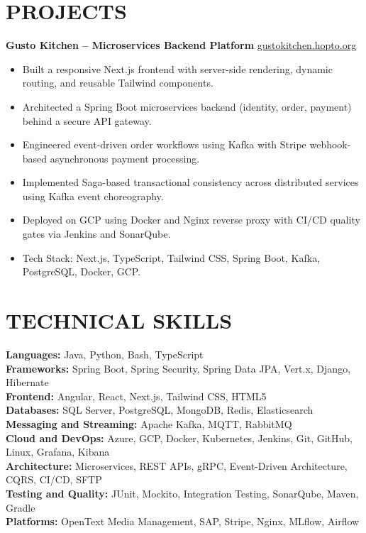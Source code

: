 \documentclass[10pt]{article}
\begin{document}
\section*{PROJECTS}
\textbf{Gusto Kitchen -- Microservices Backend Platform} \hfill \underline{\href{https://gustokitchen.hopto.org/}{gustokitchen.hopto.org}}
\begin{itemize}
  \item Built a responsive Next.js frontend with server-side rendering, dynamic routing, and reusable Tailwind components.
  \item Architected a Spring Boot microservices backend (identity, order, payment) behind a secure API gateway.
  \item Engineered event-driven order workflows using Kafka with Stripe webhook-based asynchronous payment processing.
  \item Implemented Saga-based transactional consistency across distributed services using Kafka event choreography.
  \item Deployed on GCP using Docker and Nginx reverse proxy with CI/CD quality gates via Jenkins and SonarQube.
  \item Tech Stack: Next.js, TypeScript, Tailwind CSS, Spring Boot, Kafka, PostgreSQL, Docker, GCP.
\end{itemize}

\section*{TECHNICAL SKILLS}
\textbf{Languages:} Java, Python, Bash, TypeScript \\
\textbf{Frameworks:} Spring Boot, Spring Security, Spring Data JPA, Vert.x, Django, Hibernate \\
\textbf{Frontend:} Angular, React, Next.js, Tailwind CSS, HTML5 \\
\textbf{Databases:} SQL Server, PostgreSQL, MongoDB, Redis, Elasticsearch \\
\textbf{Messaging and Streaming:} Apache Kafka, MQTT, RabbitMQ \\
\textbf{Cloud and DevOps:} Azure, GCP, Docker, Kubernetes, Jenkins, Git, GitHub, Linux, Grafana, Kibana \\
\textbf{Architecture:} Microservices, REST APIs, gRPC, Event-Driven Architecture, CQRS, CI/CD, SFTP \\
\textbf{Testing and Quality:} JUnit, Mockito, Integration Testing, SonarQube, Maven, Gradle \\
\textbf{Platforms:} OpenText Media Management, SAP, Stripe, Nginx, MLflow, Airflow
\end{document}
